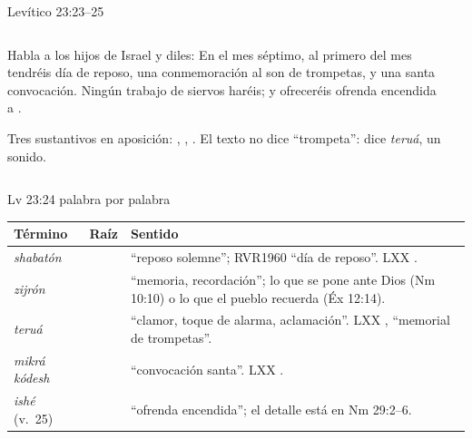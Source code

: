 \begin{frame}{Levítico 23:23--25}
\begin{columns}[c,onlytextwidth]
\begin{column}{0.57\textwidth}
\begin{cita}Habla a los hijos de Israel y diles: En el mes séptimo, al primero del mes tendréis día de reposo, una conmemoración al son de trompetas, y una santa convocación. Ningún trabajo de siervos haréis; y ofreceréis ofrenda encendida a \SENOR.\end{cita}
\small\RaggedRight Tres sustantivos en aposición: , , . El texto no dice ``trompeta'': dice \emph{teruá}, un sonido.
\end{column}
\begin{column}{0.41\textwidth}\end{column}
\end{columns}
\end{frame}

\begin{frame}{Lv 23:24 palabra por palabra}
\begin{center}\end{center}
\renewcommand{\arraystretch}{1.15}\scriptsize
\begin{tabular}{@{}L{2.7cm}L{1.6cm}L{7.2cm}@{}}
\toprule
\textbf{Término} & \textbf{Raíz} & \textbf{Sentido} \\ \midrule
{} \emph{shabatón} &  & ``reposo solemne''; RVR1960 ``día de reposo''. LXX . \\
 \emph{zijrón} &  & ``memoria, recordación''; lo que se pone ante Dios (Nm 10:10) o lo que el pueblo recuerda (Éx 12:14). \\
 \emph{teruá} &  & ``clamor, toque de alarma, aclamación''. LXX , ``memorial de trompetas''. \\
 \emph{mikrá kódesh} &  & ``convocación santa''. LXX . \\
 \emph{ishé} (v.~25) &  & ``ofrenda encendida''; el detalle está en Nm 29:2--6. \\
\bottomrule
\end{tabular}\par\smallskip
{}
\end{frame}

